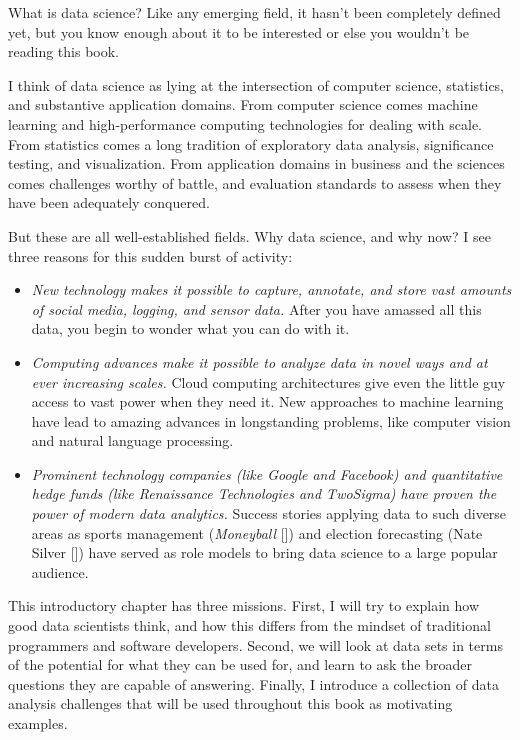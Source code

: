 \documentclass[10pt]{article}
\begin{document}
What is data science? Like any emerging field, it hasn't been completely defined yet, but you know enough about it to be interested or else you wouldn't be reading this book.

I think of data science as lying at the intersection of computer science, statistics, and substantive application domains. From computer science comes machine learning and high-performance computing technologies for dealing with scale. From statistics comes a long tradition of exploratory data analysis, significance testing, and visualization. From application domains in business and the sciences comes challenges worthy of battle, and evaluation standards to assess when they have been adequately conquered.

But these are all well-established fields. Why data science, and why now? I see three reasons for this sudden burst of activity:

\begin{itemize}
  \item \textit{New technology makes it possible to capture, annotate, and store vast amounts of social media, logging, and sensor data.} After you have amassed all this data, you begin to wonder what you can do with it.
  \item \textit{Computing advances make it possible to analyze data in novel ways and at ever increasing scales.} Cloud computing architectures give even the little guy access to vast power when they need it. New approaches to machine learning have lead to amazing advances in longstanding problems, like computer vision and natural language processing.
  \item \textit{Prominent technology companies (like Google and Facebook) and quantitative hedge funds (like Renaissance Technologies and TwoSigma) have proven the power of modern data analytics.} Success stories applying data to such diverse areas as sports management (\textit{Moneyball} [\cite{lewis2004moneyball}]) and election forecasting (Nate Silver [\cite{silver2012signal}]) have served as role models to bring data science to a large popular audience.
\end{itemize}

This introductory chapter has three missions. First, I will try to explain how good data scientists think, and how this differs from the mindset of traditional programmers and software developers. Second, we will look at data sets in terms of the potential for what they can be used for, and learn to ask the broader questions they are capable of answering. Finally, I introduce a collection of data analysis challenges that will be used throughout this book as motivating examples.
\end{document}
